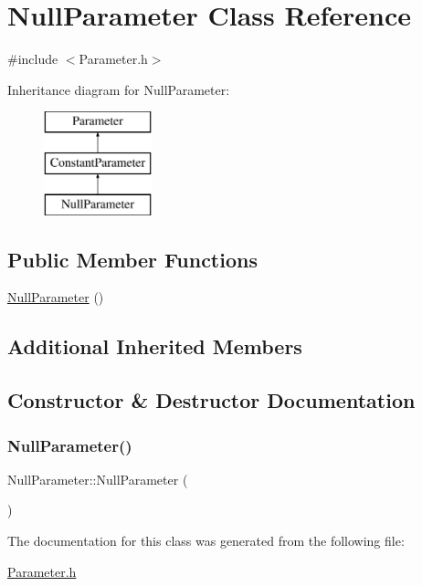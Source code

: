 \hypertarget{class_null_parameter}{}\section{Null\+Parameter Class Reference}
\label{class_null_parameter}


{\ttfamily \#include $<$Parameter.\+h$>$}

Inheritance diagram for Null\+Parameter\+:\begin{figure}[H]
\begin{center}
\leavevmode
\includegraphics[height=3.000000cm]{class_null_parameter}
\end{center}
\end{figure}
\subsection*{Public Member Functions}
\begin{DoxyCompactItemize}
\item 
\hyperlink{class_null_parameter_aa11a91b9c36438288e91fbc3613bcda7}{Null\+Parameter} ()
\end{DoxyCompactItemize}
\subsection*{Additional Inherited Members}


\subsection{Constructor \& Destructor Documentation}
\hypertarget{class_null_parameter_aa11a91b9c36438288e91fbc3613bcda7}{}\label{class_null_parameter_aa11a91b9c36438288e91fbc3613bcda7} 
\subsubsection{\texorpdfstring{Null\+Parameter()}{NullParameter()}}
{\footnotesize\ttfamily Null\+Parameter\+::\+Null\+Parameter (\begin{DoxyParamCaption}{ }\end{DoxyParamCaption})\hspace{0.3cm}{\ttfamily [inline]}}



The documentation for this class was generated from the following file\+:\begin{DoxyCompactItemize}
\item 
\hyperlink{_parameter_8h}{Parameter.\+h}\end{DoxyCompactItemize}
